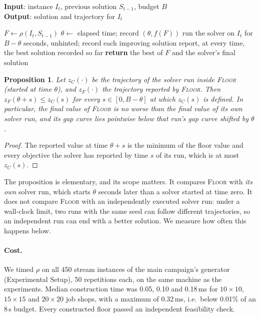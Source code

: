 \documentclass[letterpaper]{article} %
\newtheorem{proposition}{Proposition}
\newcommand{\mfloor}{\textsc{Floor}}
\begin{document}
\begin{algorithm}[tb]
\caption{\mfloor: repair floor beside an unmodified solver run}
\label{alg:floor}
\textbf{Input}: instance $I_t$, previous solution $S_{t-1}$, budget $B$\\
\textbf{Output}: solution and trajectory for $I_t$
\begin{algorithmic}[1]
\STATE $F \leftarrow \rho(I_t, S_{t-1})$ 
\STATE $\theta \leftarrow$ elapsed time; record $(\theta, f(F))$
\STATE run the solver on $I_t$ for $B-\theta$ seconds, unhinted; record each improving solution
\STATE report, at every time, the best solution recorded so far
\STATE \textbf{return} the best of $F$ and the solver's final solution
\end{algorithmic}
\end{algorithm}

\begin{proposition}
Let $z_C(\cdot)$ be the trajectory of the solver run inside \mfloor{} (started at time $\theta$), and $z_F(\cdot)$ the trajectory reported by \mfloor. Then $z_F(\theta + s) \le z_C(s)$ for every $s \in [0, B-\theta]$ at which $z_C(s)$ is defined. In particular, the final value of \mfloor{} is no worse than the final value of its own solver run, and its gap curve lies pointwise below that run's gap curve shifted by $\theta$.
\end{proposition}
\begin{proof}
The reported value at time $\theta + s$ is the minimum of the floor value and every objective the solver has reported by time $s$ of its run, which is at most $z_C(s)$.
\end{proof}

The proposition is elementary, and its scope matters. It compares \mfloor{} with \emph{its own} solver run, which starts $\theta$ seconds later than a solver started at time zero. It does not compare \mfloor{} with an independently executed solver run: under a wall-clock limit, two runs with the same seed can follow different trajectories, so an independent run can end with a better solution. We measure how often this happens below.

\paragraph{Cost.} We timed $\rho$ on all 450 stream instances of the main campaign's generator (Experimental Setup), 50 repetitions each, on the same machine as the experiments. Median construction time was 0.05, 0.10 and 0.18\,ms for $10{\times}10$, $15{\times}15$ and $20{\times}20$ job shops, with a maximum of 0.32\,ms, i.e.\ below 0.01\% of an 8\,s budget. Every constructed floor passed an independent feasibility check.
\end{document}
